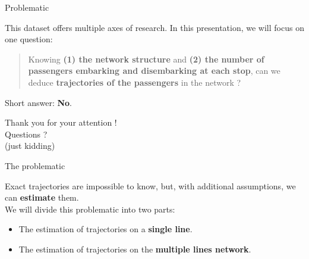 \documentclass[10pt]{beamer}
\newcommand{\imp}[1]{\textbf{\color{cyan}#1}}
\begin{document}

	\begin{frame}{Problematic}
		
		This dataset offers multiple axes of research. In this presentation, we will focus on one question: \vspace{0.4cm}
		
		\begin{quotation}
			\large
			Knowing \imp{(1) the network structure} and \imp{(2) the number of passengers embarking and disembarking at each stop}, can we deduce \imp{trajectories of the passengers} in the network ?
		\end{quotation}
		
		Short answer: {\large \imp{No}}.
	\end{frame}

	
	\begin{frame}

		\begin{center}
			\huge Thank you for your attention ! \\
			Questions ? \\
			\vspace{1cm}
			\small
			(just kidding)
		\end{center}
		
		
	\end{frame}
	
	
	\begin{frame}{The problematic}
		
		Exact trajectories are impossible to know, but, with additional assumptions, we can \imp{estimate} them. \\
		\vspace{0.4cm}
		We will divide this problematic into two parts:
		\begin{itemize}
			\item The estimation of trajectories on a \imp{single line}.
			\item The estimation of trajectories on the \imp{multiple lines network}.
		\end{itemize}
		
	\end{frame}
	
	
\end{document}
